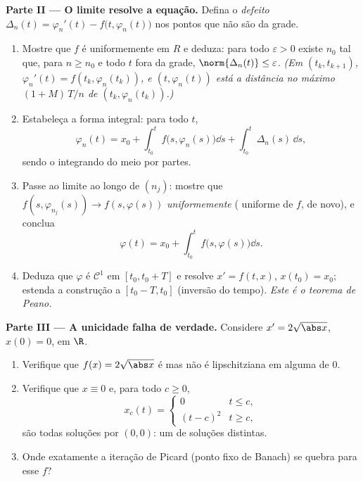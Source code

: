 \begin{problem}[{Problema de fim de semana --- existência de soluções
de $x' = f(t, x)$ sem Lipschitz}]
\medskip
\noindent\textbf{Parte II --- O limite resolve a equação.} Defina o
\emph{defeito} $\Delta_n(t) = \varphi_n'(t) -
f\bigl(t, \varphi_n(t)\bigr)$ nos pontos que não são da grade.
\begin{enumerate}[resume]
  \item Mostre que $f$ é uniformemente  em $R$ e deduza:
        para todo $\varepsilon > 0$ existe $n_0$ tal que, para $n \geq n_0$ e todo
        $t$ fora da grade, $\norm{\Delta_n(t)} \leq \varepsilon$. \emph{(Em $(t_k,
        t_{k+1})$, $\varphi_n'(t) = f(t_k, \varphi_n(t_k))$, e $(t, \varphi_n(t))$
        está a distância no máximo $(1 + M)\,T/n$ de $(t_k, \varphi_n(t_k))$.)}
  \item Estabeleça a forma integral: para todo $t$,
        \[
        \varphi_n(t) = x_0 + \int_{t_0}^{t}
        f\bigl(s, \varphi_n(s)\bigr)\dd s +
        \int_{t_0}^t \Delta_n(s)\,\dd s,
        \]
        sendo o integrando do meio  por partes.
  \item Passe ao limite ao longo de $(n_j)$: mostre que $f(s, \varphi_{n_j}(s)) \to f(s, \varphi(s))$
        \emph{uniformemente} ( uniforme de $f$, de
        novo), e conclua
        \[
        \varphi(t) = x_0 + \int_{t_0}^t
        f\bigl(s, \varphi(s)\bigr)\dd s .
        \]
  \item Deduza que $\varphi$ é $\mathcal C^1$ em $[t_0, t_0 +
        T]$ e resolve $x' = f(t, x)$, $x(t_0) = x_0$; estenda
        a construção a $[t_0 - T, t_0]$ (inversão do tempo). \emph{Este é o teorema
        de Peano.}
\end{enumerate}

\medskip
\noindent\textbf{Parte III --- A unicidade falha de verdade.}
Considere $x' = 2\sqrt{\abs x}$, $x(0) = 0$, em $\R$.
\begin{enumerate}[resume]
  \item Verifique que $f(x) = 2\sqrt{\abs x}$ é  mas não é lipschitziana em
         alguma de $0$.
  \item Verifique que $x \equiv 0$ e, para todo $c \geq 0$,
        \[
        x_c(t) = \begin{cases} 0 & t \leq c,\\ (t - c)^2 & t
        \geq c,\end{cases}
        \]
        são todas soluções por $(0,0)$: um  de soluções
        distintas.
  \item Onde exatamente a iteração de Picard (ponto fixo de Banach) se
        quebra para esse $f$?
\end{enumerate}


\end{problem}
